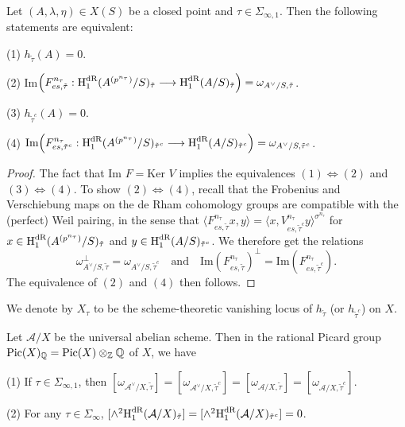 \documentclass{article}
\begin{document}
\begin{lemma} Let $(A,\lambda,\eta)\in X(S)$ be a closed point and $\tau\in \Sigma_{\infty,1}$. Then the following statements are equivalent:

	(1) $h_{\tilde\tau}(A)=0$.
	
	(2) \textnormal{Im}$\Big(F^{n_\tau}_{es,\tilde\tau}:\textnormal{H}^{\textnormal{dR}}_1(A^{(p^{n_\tau})}/S)_{\tilde\tau}\longrightarrow \textnormal{H}^{\textnormal{dR}}_1(A/S)_{\tilde\tau}\Big)=\omega_{A^\vee/S,\tilde\tau}$.

	(3) $h_{\tilde\tau^c}(A)=0$.
	
	(4) $\textnormal{Im}\Big(F^{n_\tau}_{es,\tilde\tau^c}:\textnormal{H}^{\textnormal{dR}}_1(A^{(p^{n_\tau})}/S)_{\tilde\tau^c}\longrightarrow \textnormal{H}^{\textnormal{dR}}_1(A/S)_{\tilde\tau^c}\Big)=\omega_{A^\vee/S,\tilde\tau^c}$.
\begin{proof} The fact that $\text{Im }F=\text{Ker }V$ implies the equivalences $(1)\Leftrightarrow(2)$ and $(3)\Leftrightarrow(4)$. To show $(2)\Leftrightarrow(4)$, recall that the Frobenius and Verschiebung maps on the de Rham cohomology groups are compatible with the (perfect) Weil pairing, in the sense that $\langle F^{n_\tau}_{es,\tilde\tau}x, y\rangle=\langle x, V^{n_\tau}_{es,\tilde\tau^c}y\rangle^{\sigma^{n_\tau}}$ for $x\in \textnormal{H}_1^{\textnormal{dR}}(A^{(p^{n_\tau})}/S)_{\tilde\tau}$ and $y\in \textnormal{H}^{\textnormal{dR}}_1(A/S)_{\tilde\tau^c}$. We therefore get the relations
	\begin{equation}
		\omega_{A^\vee/S,\tilde\tau}^\perp=\omega_{A^\vee/S,\tilde\tau^c}\quad \text{and} \quad \text{Im}(F^{n_\tau}_{es,\tilde\tau})^\perp=\text{Im}(F^{n_\tau}_{es,\tilde\tau^c}).
	\end{equation}
The equivalence of $(2)$ and $(4)$ then follows.
\end{proof}
\end{lemma}

\begin{notation}
We denote by $X_\tau$ to be the scheme-theoretic vanishing locus of $h_{\tilde\tau}$ (or $h_{\tilde\tau^c}$) on $X$.
\end{notation}


\begin{lemma}\label{Picard class} Let $\mathcal{A}/X$ be the universal abelian scheme. Then in the rational Picard group $\textnormal{Pic}(X)_{\mathbb{Q}}=\textnormal{Pic}(X)\otimes_{\mathbb{Z}}\mathbb{Q}$ of $X$, we have
	
	(1) If $\tau\in\Sigma_{\infty,1}$, then $[\omega_{\mathcal{A}^\vee/X,\tilde\tau}]=[\omega_{\mathcal{A}^\vee/X,\tilde\tau^c}]=[\omega_{\mathcal{A}/X,\tilde\tau}]=[\omega_{\mathcal{A}/X,\tilde\tau^c}]$.

	(2) For any $\tau\in\Sigma_{\infty}$, $[\wedge^2 \textnormal{H}^{\textnormal{dR}}_1(\mathcal{A}/X)_{\tilde\tau}]=[\wedge^2 \textnormal{H}^{\textnormal{dR}}_1(\mathcal{A}/X)_{\tilde\tau^c}]=0$.
\end{lemma}
\end{document}
